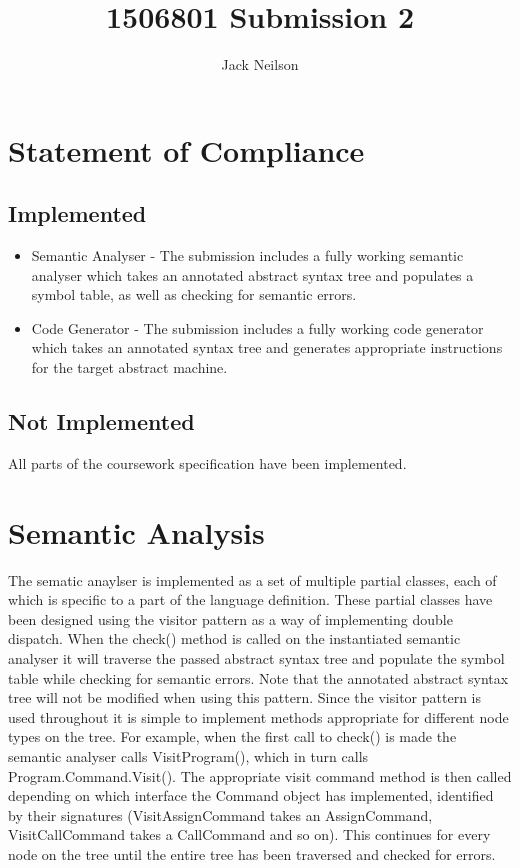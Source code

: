 \documentclass{article}
\begin{document}
\title{1506801 Submission 2}
\author{Jack Neilson}
\maketitle
\newpage
\tableofcontents
\newpage
\obeylines

\section{Statement of Compliance}
\subsection{Implemented}
\begin{itemize}
\item Semantic Analyser - The submission includes a fully working semantic analyser which takes an annotated abstract syntax tree and populates a symbol table, as well as checking for semantic errors.
\item Code Generator - The submission includes a fully working code generator which takes an annotated syntax tree and generates appropriate instructions for the target abstract machine.
\end{itemize}

\subsection{Not Implemented}
All parts of the coursework specification have been implemented.

\section{Semantic Analysis}
The sematic anaylser is implemented as a set of multiple partial classes, each of which is specific to a part of the language definition. These partial classes have been designed using the visitor pattern as a way of implementing double dispatch. When the check() method is called on the instantiated semantic analyser it will traverse the passed abstract syntax tree and populate the symbol table while checking for semantic errors. Note that the annotated abstract syntax tree will not be modified when using this pattern. Since the visitor pattern is used throughout it is simple to implement methods appropriate for different node types on the tree. For example, when the first call to check() is made the semantic analyser calls VisitProgram(), which in turn calls Program.Command.Visit(). The appropriate visit command method is then called depending on which interface the Command object has implemented, identified by their signatures (VisitAssignCommand takes an AssignCommand, VisitCallCommand takes a CallCommand and so on). This continues for every node on the tree until the entire tree has been traversed and checked for errors.
\end{document}
